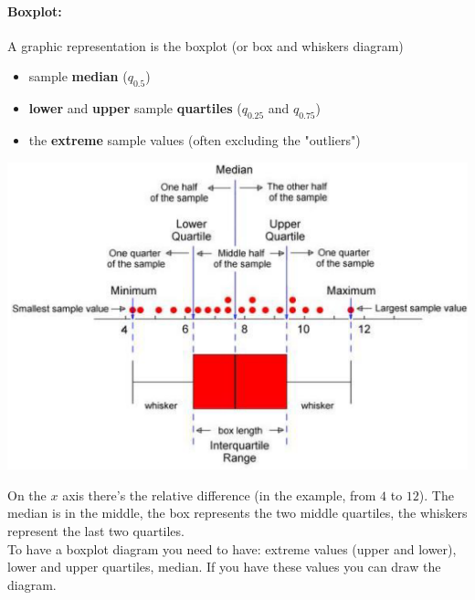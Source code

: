 \paragraph{Boxplot:} A graphic representation is the boxplot (or box and whiskers diagram)
\begin{itemize}
	\item sample \textbf{median} ($q_{0.5}$)
	\item \textbf{lower} and \textbf{upper} sample \textbf{quartiles} ($q_{0.25}$ and $q_{0.75}$)
	\item the \textbf{extreme} sample values (often excluding the "outliers")
\end{itemize}
\begin{center}
	\includegraphics[width=0.9\columnwidth]{img/boxplot1}
\end{center}
On the $x$ axis there's the relative difference (in the example, from $4$ to $12$). The median is in the middle, the box represents the two middle quartiles, the whiskers represent the last two quartiles.\\

To have a boxplot diagram you need to have: extreme values (upper and lower), lower and upper quartiles, median. If you have these values you can draw the diagram.\\

\newpage

